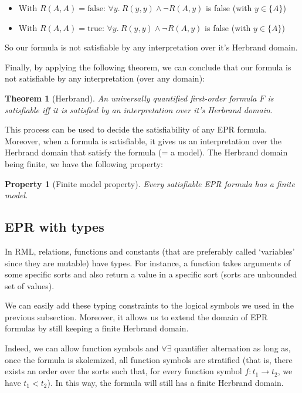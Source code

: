 \documentclass[11pt,a4paper,oldfontcommands,openany]{memoir}
\newtheorem*{theorem}{Theorem}
\newtheorem*{property}{Property}
\begin{document}
        \begin{itemize}
            \item With \(R(A,A)=\text{false}\): \(\forall y. \ R(y,y) \land \neg R(A,y)\) is false (with \( y \in \{A\} \))
            \item With \(R(A,A)=\text{true}\): \(\forall y. \ R(y,y) \land \neg R(A,y)\) is false (with \( y \in \{A\} \))
        \end{itemize}

        So our formula is not satisfiable by any interpretation over it's Herbrand domain.

        Finally, by applying the following theorem, we can conclude that our formula is not satisfiable by any interpretation (over any domain):
        \begin{theorem}[Herbrand]
            An universally quantified first-order formula \(F\) is satisfiable iff it is satisfied by an interpretation over it's Herbrand domain.
        \end{theorem}

        This process can be used to decide the satisfiability of any EPR formula. Moreover, when a formula is satisfiable,
        it gives us an interpretation over the Herbrand domain that satisfy the formula (= a model).
        The Herbrand domain being finite, we have the following property:

        \begin{property}[Finite model property]
            Every satisfiable EPR formula has a finite model.
        \end{property}

        \subsection{EPR with types}

        In RML, relations, functions and constants (that are preferably called `variables' since they are mutable) have types.
        For instance, a function takes arguments of some specific sorts and also return a value in a specific sort (sorts are unbounded set of values).

        We can easily add these typing constraints to the logical symbols we used in the previous subsection.
        Moreover, it allows us to extend the domain of EPR formulas by still keeping a finite Herbrand domain.

        Indeed, we can allow function symbols and \(\forall\exists\) quantifier alternation as long as,
        once the formula is skolemized, all function symbols are stratified (that is, there exists
        an order over the sorts such that, for every function symbol \( f: t_1 \to t_2 \), we have \( t_1 < t_2 \)).
        In this way, the formula will still has a finite Herbrand domain.
\end{document}
